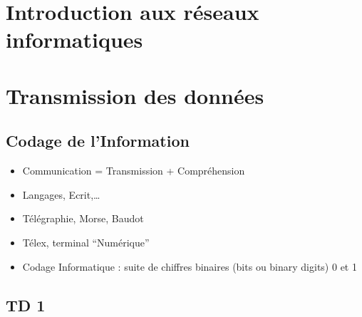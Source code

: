 \documentclass[12pt,a4paper,openany]{book}
\begin{document}
	\setcounter{tocdepth}{2}
	\setcounter{secnumdepth}{3}
	\maketitle
	\tableofcontents
	\part{Introduction aux réseaux informatiques}
		
		
		
		
		
		
%		
%		
	\part{Transmission des données}
	\chapter{Codage de l'Information}
	\begin{itemize}
		\item Communication = Transmission + Compréhension
		\item Langages, Ecrit,\ldots
		\item Télégraphie, Morse, Baudot
		\item Télex, terminal ``Numérique''
		\item Codage Informatique : suite de chiffres binaires (bits ou binary digits) 0 et 1
	\end{itemize}
	\appendix
	\chapter{TD 1}
	
\end{document}
